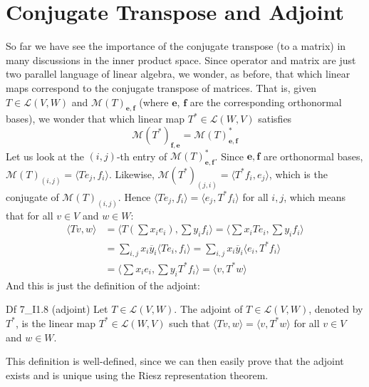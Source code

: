 \documentclass{article}
\begin{document}
\section{Conjugate Transpose and Adjoint}
So far we have see the importance of the conjugate transpose (to a matrix) in many discussions in the inner product space. Since operator and matrix are just two parallel language of linear algebra, we wonder, as before, that which linear maps correspond to the conjugate transpose of matrices. That is, given $T\in\mathcal{L}(V, W)$ and $\mathcal{M}(T)_{\pmb{e}, \pmb{f}}$ (where $\pmb{e}$, $\pmb{f}$ are the corresponding orthonormal bases), we wonder that which linear map $T^\ast\in\mathcal{L}(W, V)$ satisfies 
$$\mathcal{M}(T^\ast)_{\pmb{f}, \pmb{e}} = \mathcal{M}(T)_{\pmb{e}, \pmb{f}}^\ast$$
Let us look at the $(i,j)$-th entry of $\mathcal{M}(T)_{\pmb{e}, \pmb{f}}^\ast$. Since $\pmb{e}, \pmb{f}$ are orthonormal bases, $\mathcal{M}(T)_{(i,j)} = \langle Te_j, f_i\rangle$. Likewise, $\mathcal{M}(T^\ast)_{(j,i)} = \langle T^\ast f_i, e_j\rangle$, which is the conjugate of $\mathcal{M}(T)_{(i,j)}$. Hence $\langle Te_j, f_i\rangle = \langle e_j, T^\ast f_i\rangle$ for all $i, j$, which means that for all $v\in V$ and $w\in W$:
$$
\begin{aligned}
    \langle Tv, w\rangle &= \langle T\left(\sum x_ie_i\right), \sum y_if_i\rangle = \langle \sum x_iTe_i, \sum y_if_i\rangle \\
    &= \sum_{i,j} x_i\overline{y}_i\langle Te_i, f_i\rangle = \sum_{i,j} x_i\overline{y}_i\langle e_i, T^\ast f_i\rangle \\
    &= \langle \sum x_ie_i, \sum y_iT^\ast f_i\rangle = \langle v, T^\ast w\rangle
\end{aligned}
$$
And this is just the definition of the adjoint:
\begin{Df}{Df 7\_I1.8 (adjoint)}
    Let $T\in\mathcal{L}(V, W)$. The adjoint of $T\in\mathcal{L}(V, W)$, denoted by $T^\ast$, is the linear map $T^\ast\in\mathcal{L}(W, V)$ such that $\langle Tv, w\rangle = \langle v, T^\ast w\rangle$ for all $v\in V$ and $w\in W$.
\end{Df}
\textcolor{Th}{This definition is well-defined, since we can then easily prove that the adjoint exists and is unique using the Riesz representation theorem.}
\end{document}
